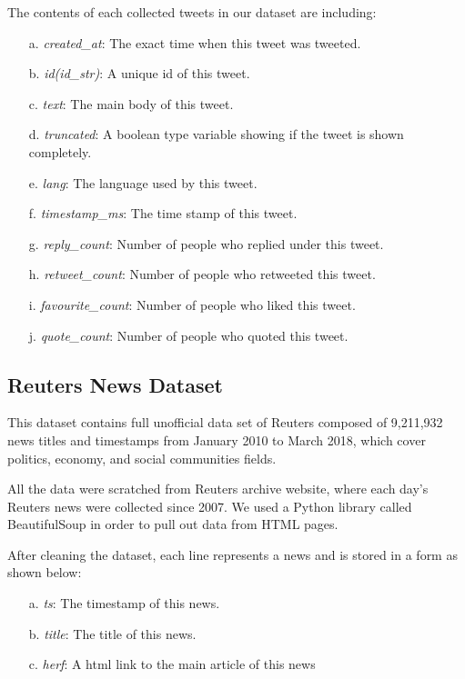 \documentclass[conference]{IEEEtran}
\begin{document}
The contents of each collected tweets in our dataset are including:
\begin{itemize}
    \item[a.] \textit{created\_at}: The exact time when this tweet was tweeted.
    \item[b.] \textit{id(id\_str)}: A unique id of this tweet.
    \item[c.] \textit{text}: The main body of this tweet.
    \item[d.] \textit{truncated}: A boolean type variable showing if the tweet is shown completely.
    \item[e.] \textit{lang}: The language used by this tweet. 
    \item[f.] \textit{timestamp\_ms}: The time stamp of this tweet. 
    \item[g.] \textit{reply\_count}: Number of people who replied under this tweet.
    \item[h.] \textit{retweet\_count}: Number of people who retweeted this tweet.
    \item[i.] \textit{favourite\_count}: Number of people who liked this tweet.
    \item[j.] \textit{quote\_count}: Number of people who quoted this tweet.
\end{itemize}
\vspace{0.5em}

\subsection{Reuters News Dataset}
This dataset contains full unofficial data set of Reuters composed of 9,211,932 news titles and timestamps from January 2010 to March 2018, which cover politics, economy, and social communities fields.

All the data were scratched from Reuters archive website, where each day’s Reuters news were collected since 2007. We used a Python library called BeautifulSoup in order to pull out data from HTML pages.

After cleaning the dataset, each line represents a news and is stored in a form as shown below:
\begin{itemize}
    \item[a.] \textit{ts}: The timestamp of this news.
    \item[b.] \textit{title}: The title of this news.
    \item[c.] \textit{herf}: A html link to the main article of this news
\end{itemize}
\end{document}
